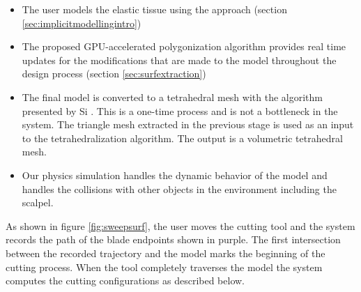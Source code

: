 \begin{itemize}
 \item The user models the elastic tissue using the \blob approach (section \ref{sec:implicitmodellingintro})
 \item The proposed GPU-accelerated polygonization algorithm provides real time updates for the modifications 
 that are made to the model throughout the design process (section \ref{sec:surfextraction})
 
 \item The final model is converted to a tetrahedral mesh with the algorithm presented by Si \etal \cite{Si2006a}.
 This is a one-time process and is not a bottleneck in the system. The triangle mesh extracted in the previous stage is 
 used as an input to the tetrahedralization algorithm. The output is a volumetric tetrahedral mesh. 
 
 \item Our physics simulation handles the dynamic behavior of the model and handles the collisions with other
 objects in the environment including the scalpel. 
\end{itemize}


As shown in figure \ref{fig:sweepsurf}, the user moves the cutting tool and the system records the path of the 
blade endpoints shown in purple. The first intersection between the recorded trajectory and the model marks the 
beginning of the cutting process. When the tool completely traverses the model the system computes the cutting
configurations as described below. 


